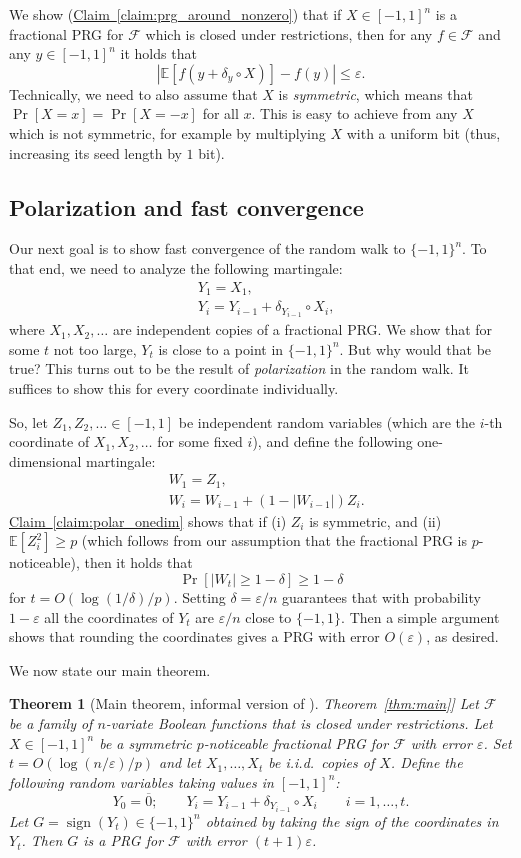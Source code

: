 \documentclass[11pt]{article}
\numberwithin{equation}{section}
\newtheorem{theorem}{Theorem}[section]
\theoremstyle{definition}
\theoremstyle{plain}
\newcommand{\expref}[2]{\hyperref[#2]{#1~\ref{#2}}}
\newcommand{\E}{\mathbb{E}}
\newcommand{\FF}{\mathcal{F}}
\newcommand{\eps}{\varepsilon}
\DeclareMathOperator{\sign}{sign}     %
\newcommand{\zero}{\overline{0}}
\begin{document}
We show (\expref{Claim}{claim:prg_around_nonzero}) that if $X \in [-1,1]^n$ is a fractional PRG for $\FF$ which is closed under restrictions, then for any
$f \in \FF$ and any $y \in [-1,1]^n$ it holds that
$$
|\E[f(y + \delta_y \circ X)] - f(y)| \le \eps.
$$
Technically, we need to also assume that $X$ is \emph{symmetric}, which means that $\Pr[X=x]=\Pr[X=-x]$ for all $x$. This is easy to achieve
from any $X$ which is not symmetric, for example by multiplying
$X$ with a uniform bit (thus, increasing its seed length by $1$ bit).

\subsection{Polarization and fast convergence}
Our next goal is to show fast convergence of the random walk to $\{-1,1\}^n$. To that end, we need
to analyze the following martingale:
\begin{align*}
&Y_1=X_1,\\
&Y_i=Y_{i-1} + \delta_{Y_{i-1}} \circ X_i,
\end{align*}
where $X_1,X_2,\ldots$ are independent copies of a fractional PRG\@. We show that for some $t$ not too large, $Y_t$ is close to a point in $\{-1,1\}^n$.
But why would that be true? This turns out to be the result of \emph{polarization} in the random walk. It suffices to show this for every coordinate individually.

So, let $Z_1,Z_2,\ldots \in [-1,1]$ be independent random variables (which are the $i$-th coordinate of $X_1,X_2,\ldots$ for some fixed $i$), and define the following one-dimensional martingale:
\begin{align*}
&W_1=Z_1,\\
&W_i=W_{i-1} + (1-|W_{i-1}|) Z_i.
\end{align*}
\expref{Claim}{claim:polar_onedim} shows that if (i) $Z_i$ is symmetric, and (ii) $\E[Z_i^2] \ge p$ (which follows from our assumption that the fractional PRG is $p$-noticeable), then it holds that
$$
\Pr[|W_t| \ge 1-\delta] \ge 1-\delta
$$
for $t=O(\log (1/\delta) / p)$. Setting $\delta=\eps/n$ guarantees that with probability $1-\eps$ all the coordinates of $Y_t$ are $\eps/n$ close to $\{-1,1\}$.
Then a simple argument shows that rounding the coordinates gives a PRG with error $O(\eps)$, as desired.

We now state our main theorem.

\begin{theorem}[Main theorem, informal version of \expref{Theorem}{thm:main}]
\label{thm:main_informal}
Let $\FF$ be a family of $n$-variate Boolean functions that is closed under restrictions.
Let $X \in [-1,1]^n$ be a symmetric $p$-noticeable fractional PRG for $\FF$ with error $\eps$.
Set $t=O(\log(n/\eps)/p)$ and let $X_1,\ldots,X_t$ be i.i.d.\ copies of $X$.
Define the following random variables taking values in $[-1,1]^n$:
$$
Y_0=\zero; \qquad Y_i = Y_{i-1} + \delta_{Y_{i-1}} \circ X_i \qquad i=1,\ldots,t.
$$
Let $G=\sign(Y_t) \in \{-1,1\}^n$ obtained by taking the sign of the coordinates in $Y_t$.
Then $G$ is a PRG for $\FF$ with error $(t+1)\eps$.
\end{theorem}
\end{document}

